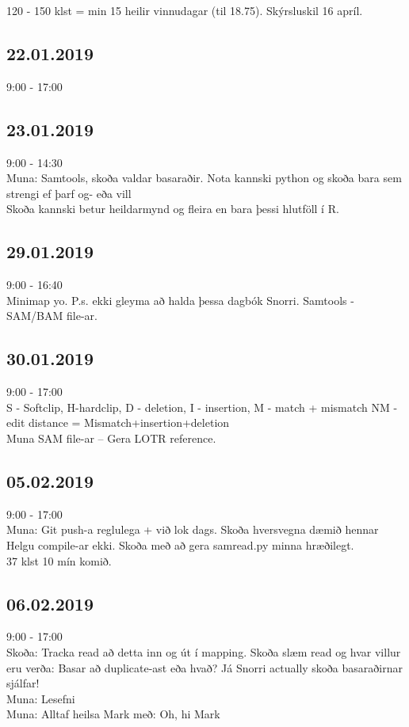 \documentclass{article}
\begin{document}
120 - 150 klst = min 15 heilir vinnudagar (til 18.75). Skýrsluskil 16 apríl.

\subsection*{22.01.2019}
9:00 - 17:00

\subsection*{23.01.2019}
9:00 - 14:30 \\
Muna:
Samtools, skoða valdar basaraðir. Nota kannski python og skoða bara sem  strengi ef þarf og- eða vill \\
Skoða kannski betur heildarmynd og fleira en bara þessi hlutföll í R.

\subsection*{29.01.2019}
9:00 - 16:40 \\
Minimap yo. P.s. ekki gleyma að halda þessa dagbók Snorri. Samtools - SAM/BAM file-ar.

\subsection*{30.01.2019}
9:00 - 17:00 \\
S - Softclip, H-hardclip, D - deletion, I - insertion, M - match + mismatch
NM - edit distance = Mismatch+insertion+deletion \\
Muna SAM file-ar -- Gera LOTR reference.

\subsection*{05.02.2019}
9:00 - 17:00\\
Muna: Git push-a reglulega + við lok dags. Skoða hversvegna dæmið hennar Helgu compile-ar ekki. Skoða með að gera samread.py minna hræðilegt. \\
37 klst 10 mín komið.

\subsection*{06.02.2019}
9:00 - 17:00\\
Skoða: Tracka read að detta inn og út í mapping. Skoða slæm read og hvar villur eru verða: Basar að duplicate-ast eða hvað? Já Snorri actually skoða basaraðirnar sjálfar! \\
Muna: Lesefni \\
Muna: Alltaf heilsa Mark með: Oh, hi Mark
\end{document}
